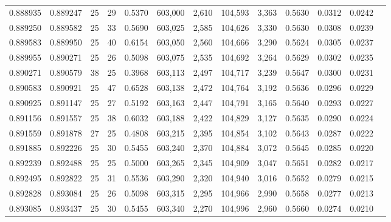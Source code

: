 \begin{tabular}{rrrrrrrrrrrrr}
0.888935 & 0.889247 &    25 &  29 &                                     0.5370 & 603,000 &   2,610 & 104,593 &   3,363 & 0.5630 & 0.0312 & 0.0242 \\
0.889250 & 0.889582 &    25 &  33 &                                     0.5690 & 603,025 &   2,585 & 104,626 &   3,330 & 0.5630 & 0.0308 & 0.0239 \\
0.889583 & 0.889950 &    25 &  40 &                                     0.6154 & 603,050 &   2,560 & 104,666 &   3,290 & 0.5624 & 0.0305 & 0.0237 \\
0.889955 & 0.890271 &    25 &  26 &                                     0.5098 & 603,075 &   2,535 & 104,692 &   3,264 & 0.5629 & 0.0302 & 0.0235 \\
0.890271 & 0.890579 &    38 &  25 &                                     0.3968 & 603,113 &   2,497 & 104,717 &   3,239 & 0.5647 & 0.0300 & 0.0231 \\
0.890583 & 0.890921 &    25 &  47 &                                     0.6528 & 603,138 &   2,472 & 104,764 &   3,192 & 0.5636 & 0.0296 & 0.0229 \\
0.890925 & 0.891147 &    25 &  27 &                                     0.5192 & 603,163 &   2,447 & 104,791 &   3,165 & 0.5640 & 0.0293 & 0.0227 \\
0.891156 & 0.891557 &    25 &  38 &                                     0.6032 & 603,188 &   2,422 & 104,829 &   3,127 & 0.5635 & 0.0290 & 0.0224 \\
0.891559 & 0.891878 &    27 &  25 &                                     0.4808 & 603,215 &   2,395 & 104,854 &   3,102 & 0.5643 & 0.0287 & 0.0222 \\
0.891885 & 0.892226 &    25 &  30 &                                     0.5455 & 603,240 &   2,370 & 104,884 &   3,072 & 0.5645 & 0.0285 & 0.0220 \\
0.892239 & 0.892488 &    25 &  25 &                                     0.5000 & 603,265 &   2,345 & 104,909 &   3,047 & 0.5651 & 0.0282 & 0.0217 \\
0.892495 & 0.892822 &    25 &  31 &                                     0.5536 & 603,290 &   2,320 & 104,940 &   3,016 & 0.5652 & 0.0279 & 0.0215 \\
0.892828 & 0.893084 &    25 &  26 &                                     0.5098 & 603,315 &   2,295 & 104,966 &   2,990 & 0.5658 & 0.0277 & 0.0213 \\
0.893085 & 0.893437 &    25 &  30 &                                     0.5455 & 603,340 &   2,270 & 104,996 &   2,960 & 0.5660 & 0.0274 & 0.0210 \\

\end{tabular}
